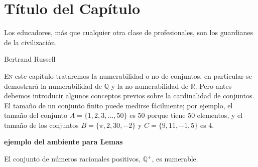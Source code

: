 
\chapter{Título del Capítulo}\label{cap:07}
\pagecolor{white}
\BgThispage
\thispagestyle{empty}
\pagestyle{isfodosuCD}
\epigraph{Los educadores, más que cualquier otra clase de profesionales, son los guardianes de la 
civilización.}{Bertrand Russell}

\lettrine[lraise=0, lines=4, loversize=0]{\textcolor{azulF}{E}}{n} este capítulo trataremos la numerabilidad o no de 
conjuntos, en particular se demostrará la numerabilidad de $\mathbb{Q}$ y la no numerabilidad de $\mathbb{R}$. Pero 
antes debemos introducir algunos conceptos previos sobre la cardinalidad de conjuntos. El tamaño de un conjunto finito 
puede medirse fácilmente; por ejemplo, el tamaño del conjunto $A=\{1,2,3,\ldots,50\}$ es $50$ porque tiene $50$ 
elementos, y el tamaño de los conjuntos $B=\{\pi,2,30,-2\}$ y $C=\{9,11,-1,5\}$ es $4$.

\textbf{ejemplo del ambiente para Lemas}

\begin{lma}[][lema:07:01] El conjunto de números racionales positivos, $\mathbb{Q}^{+}$, es numerable.
\end{lma}

\pagestyle{probprop}
\pagecolor{paginaprob}

